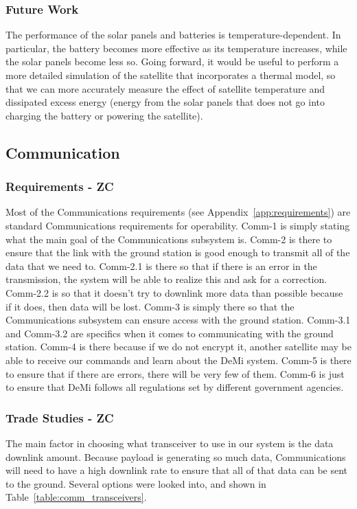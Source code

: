 \documentclass[12pt]{article}
\begin{document}
			\subsubsection{Future Work}
The performance of the solar panels and batteries is temperature-dependent.  In particular, the battery becomes more effective as its temperature increases, while the solar panels become less so.  Going forward, it would be useful to perform a more detailed simulation of the satellite that incorporates a thermal model, so that we can more accurately measure the effect of satellite temperature and dissipated excess energy (energy from the solar panels that does not go into charging the battery or powering the satellite).
		
		\subsection{Communication}
			\subsubsection{Requirements - ZC}

Most of the Communications requirements (see Appendix~\ref{app:requirements}) are standard Communications requirements for operability. Comm-1 is simply stating what the main goal of the Communications subsystem is. Comm-2 is there to ensure that the link with the ground station is good enough to transmit all of the data that we need to. Comm-2.1 is there so that if there is an error in the transmission, the system will be able to realize this and ask for a correction. Comm-2.2 is so that it doesn’t try to downlink more data than possible because if it does, then data will be lost. Comm-3 is simply there so that the Communications subsystem can ensure access with the ground station. Comm-3.1 and Comm-3.2 are specifics when it comes to communicating with the ground station. Comm-4 is there because if we do not encrypt it, another satellite may be able to receive our commands and learn about the DeMi system. Comm-5 is there to ensure that if there are errors, there will be very few of them. Comm-6 is just to ensure that DeMi follows all regulations set by different government agencies.

			\subsubsection{Trade Studies - ZC}\label{sec:comm_tradestudies}
The main factor in choosing what transceiver to use in our system is the data downlink amount. Because payload is generating so much data, Communications will need to have a high downlink rate to ensure that all of that data can be sent to the ground. Several options were looked into, and shown in Table~\ref{table:comm_transceivers}.
\end{document}
